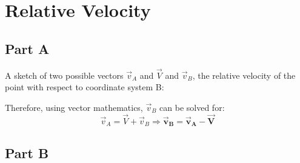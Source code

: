 \documentclass{article}
\begin{document}
\section{Relative Velocity}

\subsection*{Part A}

A sketch of two possible vectors $\vec{v}_{A}$ and $\vec{V}$ and $\vec{v}_{B}$,
the relative velocity of the point with respect to coordinate system B:
\begin{center}
\end{center}
Therefore, using vector mathematics, $\vec{v}_B$ can be solved for:
\begin{equation}
\vec{v}_{A}=\vec{V}+\vec{v}_{B}\Rightarrow\bm{\vec{v}_{B}=\vec{v}_{A}-\vec{V}}
\end{equation}

\subsection*{Part B}
\end{document}
